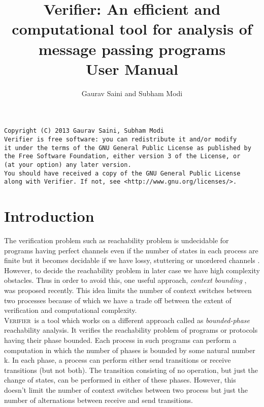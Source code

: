 \documentclass[a4paper]{article}
\title{Verifier: \large{An efficient and computational tool for analysis of message passing programs}\\\small{User Manual}}
\author{Gaurav Saini and Subham Modi}
\newcommand{\verifier}{\textsc{Verifier}}
\begin{document}
\maketitle

\pagebreak

\begin{Verbatim}[fontsize=\small]
Copyright (C) 2013 Gaurav Saini, Subham Modi
Verifier is free software: you can redistribute it and/or modify
it under the terms of the GNU General Public License as published by
the Free Software Foundation, either version 3 of the License, or
(at your option) any later version.
You should have received a copy of the GNU General Public License
along with Verifier. If not, see <http://www.gnu.org/licenses/>.
\end{Verbatim}

\pagebreak

\tableofcontents

\pagebreak

\section{Introduction}

The verification problem such as reachability problem is undecidable for programs having perfect channels 
even if the number of states in each process are finite but it becomes decidable if we have 
lossy, stuttering or unordered channels \cite{AB93}.
However, to decide the reachability problem in later case we have high complexity obstacles.
Thus in order to avoid this, one useful approach, \emph{context bounding} \cite{SJ05}, was proposed recently.
This idea limits the number of context switches between two processes because of which 
we have a trade off between the extent of verification and computational complexity.\\


\verifier\ is a tool which works on a different approach called as \emph{bounded-phase} 
reachability analysis. It verifies the reachability problem of programs or protocols
having their phase bounded. Each process in such programs can perform a computation in which 
the number of phases is bounded by some natural number k. In each phase, a process can perform 
either send transitions or receive transitions (but not both). The transition consisting of no operation, 
but just the change of states, can be performed in either of these phases. However, this doesn't limit the 
number of context switches between two process but just the number of alternations between receive and 
send transitions.\\
\end{document}
